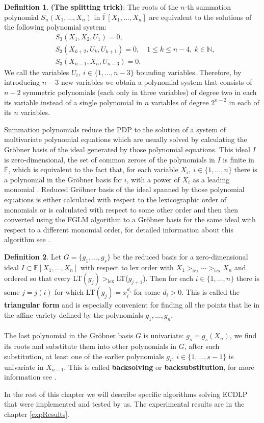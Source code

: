 \documentclass[thesis=M,english]{FITthesis}[2012/10/20]
\theoremstyle{remark}
\theoremstyle{definition}
\newtheorem{DF}{Definition}[section]
\begin{document}
\begin{DF}\textbf{(The splitting trick)}: The roots of the $n$-th summation polynomial $S_n(X_1,\ldots,X_n)$ in $\overline{\mathbb{F}}[X_1,\ldots,X_n]$ are equivalent to the solutions of the following polynomial system:
\begin{align*}
&S_3(X_1,X_2,U_1) = 0, \\
&S_3(X_{k+2}, U_{k}, U_{k+1}) = 0, \quad 1 \leq k \leq n-4,\ k \in \mathbb{N}, \\
&S_3(X_{n-1}, X_n, U_{n-3}) = 0.
\end{align*} 
We call the variables $U_i,\ i \in \{1, \ldots, n - 3\}$ bounding variables. Therefore, by introducing $n-3$ new variables we obtain a polynomial system that consists of $n-2$ symmetric polynomials (each only in three variables) of degree two in each its variable instead of a single polynomial in $n$ variables of degree $2^{n-2}$ in each of its $n$ variables.
\end{DF}
\noindent Summation polynomials reduce the PDP to the solution of a system of multivariate polynomial equations which are usually solved by calculating the Gröbner basis of the ideal generated by those polynomial equations. This ideal $I$ is zero-dimensional, the set of common zeroes of the polynomials in $I$ is finite in $\overline{\mathbb{F}}$, which is equivalent to the fact that, for each variable $X_i,\ i \in \{1,\ldots,n\}$ there is a polynomial in the Gröbner basis for $i$, with a power of $X_i$ as a leading monomial \cite{FGLM}. Reduced Gröbner basis of the ideal spanned by those polynomial equations is either calculated with respect to the lexicographic order of monomials or is calculated with respect to some other order and then then converted using the FGLM algorithm to a Gröbner basis for the same ideal with respect to a different monomial order, for detailed information about this algorithm see \cite{FGLM}.
\begin{DF}
Let $G = \{g_1,\ldots,g_s\}$ be the reduced basis for a zero-dimensional ideal $I \subset \mathbb{F}[X_1,\ldots,X_n]$ with respect to lex order with $X_1 >_{\text{lex}} \cdots >_{\text{lex}} X_n$ and ordered so that every LT$(g_j) >_{\text{lex}} $LT($g_{j+1}$). Then for each $i \in \{1,\ldots,n\}$ there is some $j=j(i)$ for which LT$(g_j)=x_i^{d_i}$ for some $d_i > 0.$ This is called the \textbf{triangular form} and is especially convenient for finding all the points that lie in the affine variety defined by the polynomials $g_1,\ldots,g_n$. \\ \\
\noindent The last polynomial in the Gröbner basis $G$ is univariate: $g_s = g_s(X_n)$, we find its roots and substitute them into other polynomials in $G$, after such substitution, at least one of the earlier polynomials $g_i,\ i \in \{1,\ldots,s-1\}$ is univariate in $X_{n-1}$. This is called \textbf{backsolving} or \textbf{backsubstitution}, for more information see \cite{week11}.
\end{DF}
\noindent In the rest of this chapter we will describe specific algorithms solving ECDLP that were implemented and tested by us. The experimental results are in the chapter \ref{expResults}.
\end{document}
